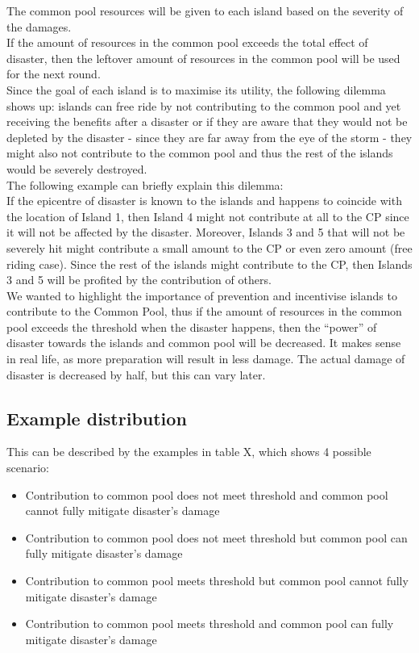 The common pool resources will be given to each island based on the severity of the damages.\\

If the amount of resources in the common pool exceeds the total effect of disaster, then the leftover amount of resources in the common pool will be used for the next round.\\

Since the goal of each island is to maximise its utility, the following dilemma shows up: islands can free ride by not contributing to the common pool and yet receiving the benefits after a disaster or if they are aware that they would not be depleted by the disaster - since they are far away from the eye of the storm - they might also not contribute to the common pool and thus the rest of the islands would be severely destroyed. \\

The following example can briefly explain this dilemma:\\

If the epicentre of disaster is known to the islands and happens to coincide with the location of Island 1, then Island 4 might not contribute at all to the CP since it will not be affected by the disaster. Moreover, Islands 3 and 5 that will not be severely hit might contribute a small amount to the CP or even zero amount (free riding case). Since the rest of the islands might contribute to the CP, then Islands 3 and 5 will be profited by the contribution of others.\\

We wanted to highlight the importance of prevention and incentivise islands to contribute to the Common Pool, thus if the amount of resources in the common pool exceeds the threshold when the disaster happens, then the “power” of disaster towards the islands and common pool will be decreased. It makes sense in real life, as more preparation will result in less damage. The actual damage of disaster is decreased by half, but this can vary later.\\

\subsection{Example distribution}
This can be described by the examples in table X, which shows 4 possible scenario:\\ 

\begin{itemize}
    \item Contribution to common pool does not meet threshold and common pool cannot fully mitigate disaster’s damage
    \item Contribution to common pool does not meet threshold but common pool can fully mitigate disaster’s damage
    \item Contribution to common pool meets threshold but common pool cannot fully mitigate disaster’s damage
    \item Contribution to common pool meets threshold and common pool can fully mitigate disaster’s damage
\end{itemize}

